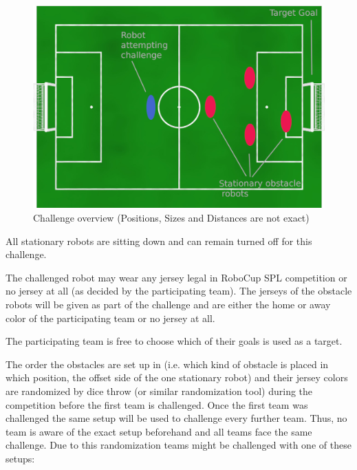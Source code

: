 \begin{figure}[ht]
	\centering
	\includegraphics[width=1.0\textwidth]{figs/obstacle_challenge_2021.jpeg}
	\caption{Challenge overview (Positions, Sizes and Distances are not exact)}
\end{figure}

All stationary robots are sitting down and can remain turned off for this challenge.



The challenged robot may wear any jersey legal in RoboCup SPL competition or no jersey at all (as decided by the participating team). The jerseys of the obstacle robots will be given as part of the challenge and are either the home or away color of the participating team or no jersey at all.

The participating team is free to choose which of their goals is used as a target.

The order the obstacles are set up in (i.e. which kind of obstacle is placed in which position, the offset side of the one stationary robot) and their jersey colors are randomized by dice throw (or similar randomization tool) during the competition before the first team is challenged. Once the first team was challenged the same setup will be used to challenge every further team. Thus, no team is aware of the exact setup beforehand and all teams face the same challenge. Due to this randomization teams might be challenged with one of these setups:


